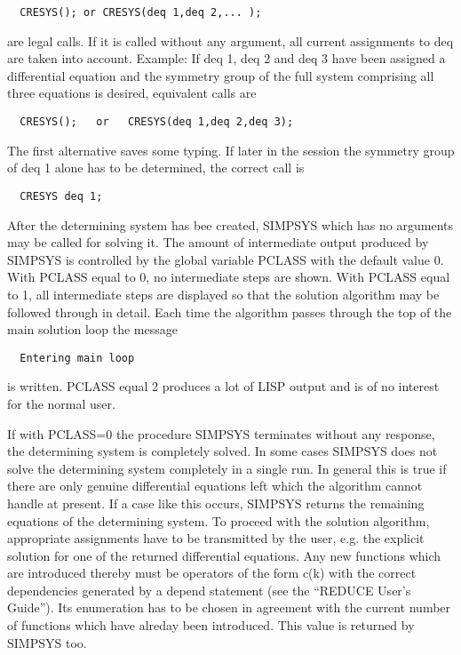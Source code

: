 \begin{verbatim}
  CRESYS(); or CRESYS(deq 1,deq 2,... );
\end{verbatim}

 are legal calls. If it is called without any argument, all current
assignments to deq are taken into account. Example: If deq 1, deq 2
and deq 3 have been assigned a differential equation and the symmetry
group of the full system comprising all three equations is desired,
equivalent calls are

\begin{verbatim}
  CRESYS();   or   CRESYS(deq 1,deq 2,deq 3);
\end{verbatim}

The first alternative saves some typing. If later in the session the
symmetry group of deq 1 alone has to be determined, the correct call
is

\begin{verbatim}
  CRESYS deq 1;
\end{verbatim}

After the determining system has bee created, SIMPSYS which has no
arguments may be called for solving it. The amount of intermediate
output produced by SIMPSYS is controlled by the global variable PCLASS
with the default value 0.  With PCLASS equal to 0, no
intermediate steps are shown. With PCLASS equal to 1, all intermediate
steps are displayed so that the solution algorithm may be followed
 through in detail. Each time the algorithm
passes through the top of the main solution loop the message

\begin{verbatim}
  Entering main loop
\end{verbatim}

is written. PCLASS equal 2 produces a lot of LISP output and is of no
interest for the normal user.

If with PCLASS=0 the procedure SIMPSYS terminates without any
response, the determining system is completely solved.  In some cases
SIMPSYS does not solve the determining system completely in a single
run. In general this is true if there are only genuine differential
equations left which the algorithm cannot handle at present. If a case
like this occurs, SIMPSYS returns the remaining equations of the
determining system. To proceed with the solution algorithm,
appropriate assignments have to be transmitted by the user, e.g. the
explicit solution for one of the returned differential equations. Any
new functions which are introduced thereby must be operators of the
form c(k) with the correct dependencies generated by a depend
statement (see the ``REDUCE User's Guide''). Its enumeration has to be
chosen in agreement with the current number of functions which have
alreday been introduced.  This value is returned by SIMPSYS too.

